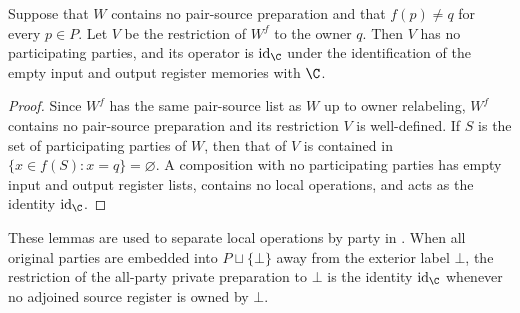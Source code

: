 \begin{lemma}
    \label{thm:peps_owner_disjoint_restriction}
    \leanok
    Suppose that $W$ contains no pair-source preparation and that
    $f(p)\ne q$ for every $p\in P$. Let $V$ be the restriction of $W^f$
    to the owner $q$. Then $V$ has no participating parties, and its operator is
    $\operatorname{id}_{\C}$ under the identification of the
    empty input and output register memories with $\C$.
\end{lemma}

\begin{proof}\leanok
    Since $W^f$ has the same pair-source list as $W$ up to owner relabeling,
    $W^f$ contains no pair-source preparation and its restriction $V$ is
    well-defined. If $S$ is the set of participating parties of $W$, then that
    of $V$ is contained in $\{x\in f(S):x=q\}=\varnothing$. A composition with no
    participating parties has empty input and output register lists, contains no
    local operations, and acts as the identity $\operatorname{id}_{\C}$.
\end{proof}

These lemmas are used to separate local operations by party in
\cite[proof of Theorem~5.2]{OpenAI2026PolynomialPEPS}.
When all original parties are embedded into $P\sqcup\{\bot\}$ away from the
exterior label $\bot$, the restriction of the all-party private preparation to
$\bot$ is the identity $\operatorname{id}_{\C}$ whenever no adjoined source
register is owned by $\bot$.

